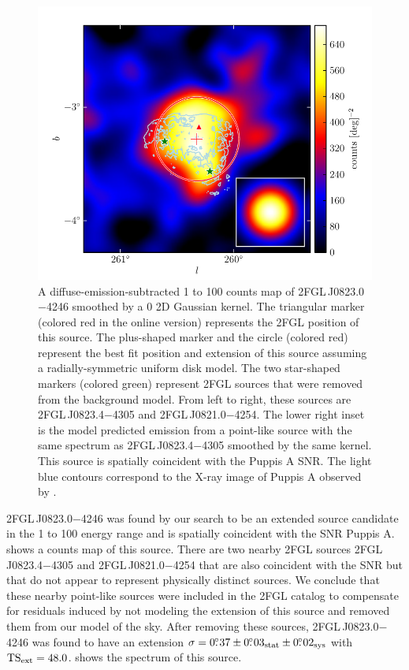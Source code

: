\begin{figure}[htbp]
  \includegraphics{chapters/extended_search/figures/source_plots/source_Puppis_A_color.pdf}
  \caption{A diffuse-emission-subtracted 1 \gev to 100 \gev counts
  map of 2FGL\,J0823.0$-$4246 smoothed by a 0 2D Gaussian kernel.
  The triangular marker (colored red in the online version) represents the
  2FGL position of this source.  The plus-shaped marker and the circle
  (colored red) represent the best fit position and extension of this
  source assuming a radially-symmetric uniform disk model.  The two
  star-shaped markers (colored green) represent 2FGL sources that were
  removed from the background model.  From left to right, these sources
  are 2FGL\,J0823.4$-$4305 and 2FGL\,J0821.0$-$4254.  The lower right
  inset is the model predicted emission from a point-like source with
  the same spectrum as 2FGL\,J0823.4$-$4305 smoothed by the same kernel.
  This source is spatially coincident with the Puppis A SNR. The light
  blue contours correspond to the X-ray image of Puppis A observed by
  \rosat \citep{petre_1996a_central-stellar}.}
\end{figure}

2FGL\,J0823.0$-$4246 was found by our search to be an extended source
candidate in the 1 \gev to 100 \gev energy range and is spatially
coincident with the SNR Puppis A.  
shows a counts map of this source. There are two nearby 2FGL sources
2FGL\,J0823.4$-$4305 and 2FGL\,J0821.0$-$4254 that are also coincident
with the SNR but that do not appear to represent physically distinct
sources.  We conclude that these nearby point-like sources were included
in the 2FGL catalog to compensate for residuals induced by not modeling
the extension of this source and removed them from our model of the sky.
After removing these sources, 2FGL\,J0823.0$-$4246 was found to have
an extension $\sigma=0\mbox{$.\!\!^\circ$}37\pm0\mbox{$.\!\!^\circ$}03_\text{stat}\pm0\mbox{$.\!\!^\circ$}02_\text{sys}$ with
$\mathrm{TS}_\mathrm{ext}=48.0$.   shows the spectrum of this source.

